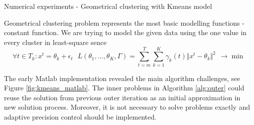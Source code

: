 \documentclass[final,hyperref={pdfpagelabels=false}]{beamer}
\begin{document}
\begin{frame}[t]
\begin{columns}[t]
\begin{column}{.48\textwidth}

\begin{block}{Numerical experiments -  Geometrical clustering with Kmeans model} 

Geometrical clustering problem represents the most basic modelling functions - constant function. 
We are trying to model the given data using the one value in every cluster in least-square sence
\begin{displaymath}
 \forall t \in T_k: x^t = \theta_k + \epsilon_t ~~~ 
 L(\theta_1, \dots, \theta_K, \Gamma) 
 = \sum\limits_{t = m}^{T} \sum\limits_{k = 1}^{K} \gamma_k(t) \Vert x^t - \theta_k \Vert^2 ~~ \rightarrow \min 
\end{displaymath}

The early Matlab implementation revealed the main algorithm challenges, see Figure \ref{fig:kmeans_matlab}. The inner problems in Algorithm \ref{alg:outer} could reuse the solution from previous outer iteration
as an initial approximation in new solution process. Moreover, it is not necessary to solve problems exactly and adaptive precision control should be implemented.


\end{block}
\end{column}
\end{columns}
\end{frame}
\end{document}
